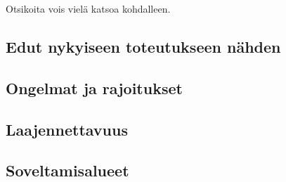 Otsikoita vois vielä katsoa kohdalleen.

\subsection{Edut nykyiseen toteutukseen nähden}


\subsection{Ongelmat ja rajoitukset}


\subsection{Laajennettavuus}


\subsection{Soveltamisalueet}
